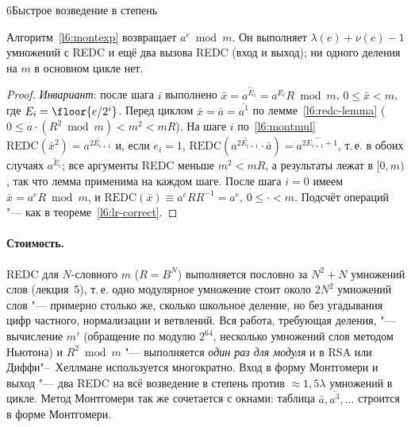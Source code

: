 \begin{lecture}{6}{Быстрое возведение в степень}
\begin{theorem}\label{l6:montexp-correct}
Алгоритм~\ref{l6:montexp} возвращает $a^e \bmod m$. Он выполняет $\lambda(e) + \nu(e) - 1$
умножений с REDC и ещё два вызова REDC (вход и выход); ни одного деления на $m$ в основном
цикле нет.
\end{theorem}

\begin{proof}
\emph{Инвариант}: после шага $i$ выполнено $\bar x = \overline{a^{E_i}} = a^{E_i} R \bmod m$,
$0 \le \bar x < m$, где $E_i = \floor{e/2^i}$. Перед циклом $\bar x = \bar a = \overline{a^{1}}$
по лемме~\ref{l6:redc-lemma} ($0 \le a \cdot (R^2 \bmod m) < m^2 < mR$). На шаге $i$
по~\eqref{l6:montmul} $\mathrm{REDC}(\bar x^2) = \overline{a^{2E_{i+1}}}$ и, если $e_i = 1$,
$\mathrm{REDC}(\overline{a^{2E_{i+1}}} \cdot \bar a) = \overline{a^{2E_{i+1} + 1}}$, т.\,е.
в обоих случаях $\overline{a^{E_i}}$; все аргументы REDC меньше $m^2 < mR$, а результаты лежат
в $[0, m)$, так что лемма применима на каждом шаге. После шага $i = 0$ имеем
$\bar x = a^e R \bmod m$, и $\mathrm{REDC}(\bar x) \equiv a^e R R^{-1} = a^e$, $0 \le \cdot < m$.
Подсчёт операций "--- как в теореме~\ref{l6:lr-correct}.
\end{proof}

\paragraph{Стоимость.} REDC для $N$-словного $m$ ($R = B^N$) выполняется пословно за
$N^2 + N$ умножений слов (лекция~5), т.\,е. одно модулярное умножение стоит около $2N^2$ умножений
слов "--- примерно столько же, сколько школьное деление, но без угадывания цифр частного,
нормализации и ветвлений. Вся работа, требующая деления, "--- вычисление $m'$ (обращение по
модулю $2^{64}$, несколько умножений слов методом Ньютона) и $R^2 \bmod m$ "--- выполняется
\emph{один раз для модуля} и в RSA или Диффи"--~Хеллмане используется многократно. Вход в форму
Монтгомери и выход "--- два REDC на всё возведение в степень против $\approx 1{,}5\lambda$
умножений в цикле. Метод Монтгомери так же сочетается с окнами: таблица $\bar a, \overline{a^3},
\dots$ строится в форме Монтгомери.


\end{lecture}
